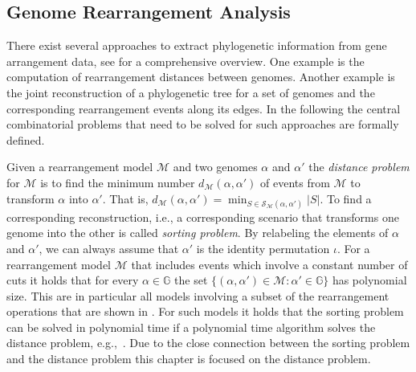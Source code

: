 \documentclass{svmult}
\begin{document}
\subsection{Genome Rearrangement Analysis}

There exist several approaches to extract phylogenetic information from 
gene arrangement data, see \cite{Felsenstein_2004} for a comprehensive
overview. One example is the computation of rearrangement distances between genomes. Another example is the
joint reconstruction of a phylogenetic tree for a set of genomes and the corresponding rearrangement events along its edges. 
In the following the central 
combinatorial problems that need to be solved for such approaches are formally defined.

Given a rearrangement model $\mathcal{M}$ and two genomes $\alpha$ and $\alpha'$ the 
\emph{distance problem} for $\mathcal{M}$ is to find the minimum number 
$d_\mathcal{M}(\alpha,\alpha')$ of events from $\mathcal{M}$ to transform
$\alpha$ into $\alpha'$. That is,
$d_\mathcal{M}(\alpha,\alpha')=\min_{S\in\mathcal{S}_\mathcal{M}(\alpha,\alpha')}|S|$.
To find a corresponding reconstruction, i.e., a corresponding scenario that transforms one genome into 
the other is called \emph{sorting problem}. By relabeling the
elements of $\alpha$ and $\alpha'$, we can always assume that $\alpha'$ is the identity
permutation $\iota$. 
%
For a rearrangement model $\mathcal{M}$ that includes events which involve a
constant number of cuts it holds that for every $\alpha\in\mathbb{G}$ the set 
$\{ (\alpha,\alpha')\in \mathcal{M} : \alpha'\in\mathbb{G} \}$ has
polynomial size. This are in particular all models involving a subset of the
rearrangement operations that are shown in . 
For such models it holds that the sorting problem can be solved 
in polynomial time if a polynomial time algorithm solves the distance problem, e.g.,~\cite{Bergeron_2010,Hannenhalli_1999}.
Due to the close connection between the sorting problem and the distance problem this chapter is focused on the distance problem. 
\end{document}
